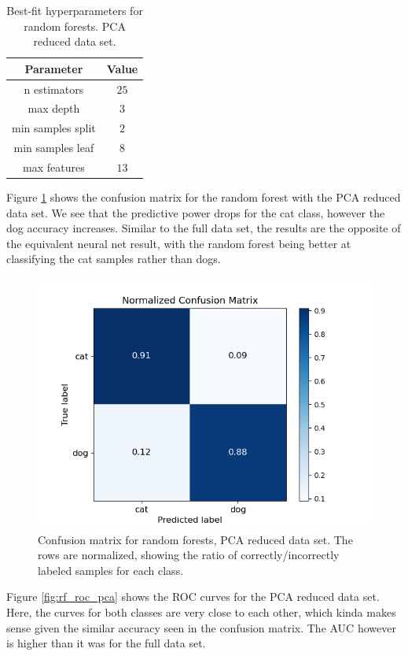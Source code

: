 \documentclass[a4paper]{article}
\begin{document}
\begin{table}[H]
  \centering
  \caption{Best-fit hyperparameters for random forests. PCA reduced data set.}
  \label{tab:best_fit_rf_pca}
  \begin{tabular}{c|c}
    \hline\hline
    Parameter & Value\\\hline
    n estimators &  $25$\\
    max depth &  $3$\\
    min samples split & $2$ \\
    min samples leaf  & $8$\\
    max features & $13$ %
    \end{tabular}
\end{table}
Figure \ref{fig:rf_confusion_pca} shows the confusion matrix for the random forest with the PCA reduced data set. We see that the predictive power drops for the cat class, however the dog accuracy increases. Similar to the full data set, the results are the opposite of the equivalent neural net result, with the random forest being better at classifying the cat samples rather than dogs.
\begin{figure}[H]
	\centering
	\includegraphics[scale=0.6]{../figures/random_forest/confusion_matrix_nbins200_pca35_seed4155_ts0.20.png}
	\caption{Confusion matrix for random forests, PCA reduced data set. The rows are normalized, showing the ratio of correctly/incorrectly labeled samples for each class.}
	\label{fig:rf_confusion_pca}
\end{figure}	
Figure \ref{fig:rf_roc_pca} shows the ROC curves for the PCA reduced data set. Here, the curves for both classes are very close to each other, which kinda makes sense given the similar accuracy seen in the confusion matrix. The AUC however is higher than it was for the full data set.
\end{document}

